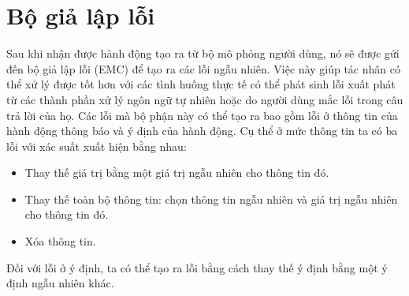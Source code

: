 \section{Bộ giả lập lỗi}
\label{sec:emc}
Sau khi nhận được hành động tạo ra từ bộ mô phỏng người dùng, nó sẽ được gửi đến bộ giả lập lỗi (EMC) để tạo ra các lỗi ngẫu nhiên. Việc này giúp tác nhân có thể xử lý được tốt hơn với các tình huống thực tế có thể phát sinh lỗi xuất phát từ các thành phần xử lý ngôn ngữ tự nhiên hoặc do người dùng mắc lỗi trong câu trả lời của họ. Các lỗi mà bộ phận này có thể tạo ra bao gồm lỗi ở thông tin của hành động thông báo và ý định của hành động. Cụ thể ở mức thông tin ta có ba lỗi với xác suất xuất hiện bằng nhau:

\begin{itemize}
    \item Thay thế giá trị bằng một giá trị ngẫu nhiên cho thông tin đó.
    \item Thay thế toàn bộ thông tin: chọn thông tin ngẫu nhiên và giá trị ngẫu nhiên cho thông tin đó.
    \item Xóa thông tin.
\end{itemize}

Đối với lỗi ở ý định, ta có thể tạo ra lỗi bằng cách thay thế ý định bằng một ý định ngẫu nhiên khác.

